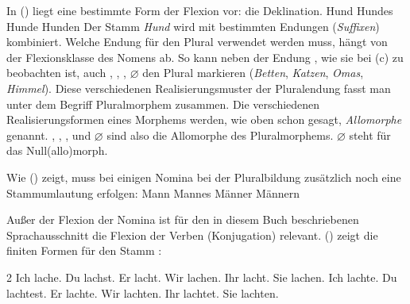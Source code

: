 In () liegt eine bestimmte Form der Flexion vor: die Deklination.
\eal
\ex Hund\label{bsp-hund-nom}
\ex Hundes\label{bsp-hund-gen}
\ex Hunde
\ex Hunden
\zl
Der Stamm \emph{Hund} wird mit bestimmten Endungen (\emph{Suffixen})
kombiniert. Welche Endung für den Plural verwendet werden muss, hängt von der Flexionsklasse
des Nomens ab. So kann neben der Endung , wie sie bei (c) zu beobachten ist, auch
, , , $\varnothing$ den Plural markieren (\emph{Betten},
\emph{Katzen}, \emph{Omas}, \emph{Himmel}). Diese verschiedenen Realisierungsmuster der Pluralendung
fasst man unter dem Begriff Pluralmorphem zusammen. Die verschiedenen Realisierungsformen eines
Morphems werden, wie oben schon gesagt, \emph{Allomorphe} genannt. , , ,  und
$\varnothing$ sind also die Allomorphe des Pluralmorphems. $\varnothing$ steht für das Null(allo)morph.

Wie () zeigt, muss bei einigen Nomina bei der Pluralbildung zusätzlich noch eine Stammumlautung erfolgen:
\eal
\ex Mann\label{bsp-mann-nom}
\ex Mannes\label{bsp-mann-gen}
\ex Männer
\ex Männern
\zl


\noindent
Außer der Flexion der Nomina ist für den in diesem Buch beschriebenen Sprachausschnitt die 
Flexion der Verben (Konjugation) relevant. () zeigt die finiten Formen für
den Stamm :
\begin{multicols}{2}
\eal
\label{verb-konjugation-praesens}
\ex Ich lache.
\ex Du  lachst.
\ex Er  lacht.
\ex Wir lachen.
\ex Ihr lacht.
\ex Sie lachen.
\zl
\eal
\label{verb-konjugation-praeteritum}
\ex Ich lachte.
\ex Du  lachtest.
\ex Er  lachte.
\ex Wir lachten.
\ex Ihr lachtet.
\ex Sie lachten.
\zl
\end{multicols}
\largerpage


